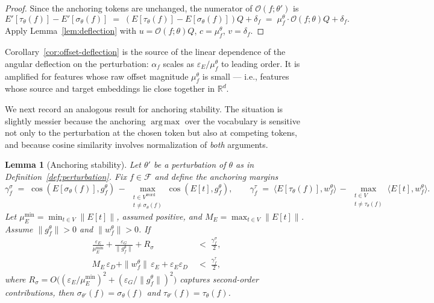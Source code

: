 \documentclass[11pt,letterpaper]{article}
\newtheorem{lemma}[theorem]{Lemma}
\theoremstyle{definition}
\DeclareMathOperator*{\argmax}{arg\,max}
\DeclareMathOperator{\cossim}{cos}
\begin{document}
\begin{proof}
Since the anchoring tokens are unchanged, the numerator of $\mathcal{O}(f; \theta')$ is
\[
E'[\tau_\theta(f)] - E'[\sigma_\theta(f)] \;=\; (E[\tau_\theta(f)] - E[\sigma_\theta(f)]) Q + \delta_f \;=\; \mu_f^\theta \cdot \mathcal{O}(f; \theta) Q + \delta_f.
\]
Apply Lemma~\ref{lem:deflection} with $u = \mathcal{O}(f; \theta) Q$, $c = \mu_f^\theta$, $v = \delta_f$.
\end{proof}

Corollary~\ref{cor:offset-deflection} is the source of the linear dependence of the angular deflection on the perturbation: $\alpha_f$ scales as $\varepsilon_E / \mu_f^\theta$ to leading order. It is amplified for features whose raw offset magnitude $\mu_f^\theta$ is small --- i.e., features whose source and target embeddings lie close together in $\mathbb{R}^d$.

We next record an analogous result for anchoring stability. The situation is slightly messier because the anchoring $\argmax$ over the vocabulary is sensitive not only to the perturbation at the chosen token but also at competing tokens, and because cosine similarity involves normalization of \emph{both} arguments.

\begin{lemma}[Anchoring stability]
\label{lem:anchoring-stability}
Let $\theta'$ be a perturbation of $\theta$ as in Definition~\ref{def:perturbation}. Fix $f \in \mathcal{F}$ and define the \emph{anchoring margins}
\[
\gamma_f^\sigma \;=\; \cossim(E[\sigma_\theta(f)], g_f^\theta) \,-\, \max_{\substack{t \in V^{\mathrm{word}} \\ t \neq \sigma_\theta(f)}} \cossim(E[t], g_f^\theta), \qquad
\gamma_f^\tau \;=\; \big\langle E[\tau_\theta(f)], w_f^\theta \big\rangle \,-\, \max_{\substack{t \in V \\ t \neq \tau_\theta(f)}} \big\langle E[t], w_f^\theta \big\rangle.
\]
Let $\mu_E^{\min} = \min_{t \in V} \|E[t]\|$, assumed positive, and $M_E = \max_{t \in V} \|E[t]\|$. Assume $\|g_f^\theta\| > 0$ and $\|w_f^\theta\| > 0$. If
\begin{align}
\frac{\varepsilon_E}{\mu_E^{\min}} + \frac{\varepsilon_G}{\|g_f^\theta\|} + R_\sigma &\;<\; \frac{\gamma_f^\sigma}{2}, \tag{$\sigma$-cond} \label{eq:sigma-cond} \\
M_E \, \varepsilon_D + \|w_f^\theta\| \, \varepsilon_E + \varepsilon_E \varepsilon_D &\;<\; \frac{\gamma_f^\tau}{2}, \tag{$\tau$-cond} \label{eq:tau-cond}
\end{align}
where $R_\sigma = O\!\big((\varepsilon_E / \mu_E^{\min})^2 + (\varepsilon_G / \|g_f^\theta\|)^2\big)$ captures second-order contributions, then $\sigma_{\theta'}(f) = \sigma_\theta(f)$ and $\tau_{\theta'}(f) = \tau_\theta(f)$.
\end{lemma}
\end{document}
